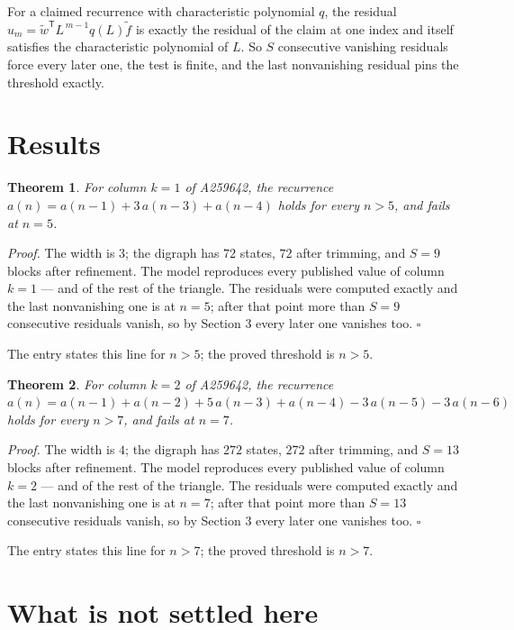 \documentclass[11pt]{article}
\newtheorem{theorem}{Theorem}
\theoremstyle{definition}
\begin{document}
For a claimed recurrence with characteristic polynomial $q$, the residual $u_m = \tilde w^{\mathsf T}L^{\,m-1}q(L)\tilde f$ is exactly the residual of the claim at one index and itself satisfies the characteristic polynomial of $L$. So $S$ consecutive vanishing residuals force every later one, the test is finite, and the last nonvanishing residual pins the threshold exactly.

\section{Results}

\begin{theorem} For column $k = 1$ of A259642, the recurrence $a(n) = a(n-1) + 3\,a(n-3) + a(n-4)$ holds for every $n > 5$, and fails at $n = 5$.\end{theorem}

{\itshape Proof.} The width is $3$; the digraph has $72$ states, $72$ after trimming, and $S = 9$ blocks after refinement. The model reproduces every published value of column $k = 1$ --- and of the rest of the triangle. The residuals were computed exactly and the last nonvanishing one is at $n = 5$; after that point more than $S = 9$ consecutive residuals vanish, so by Section 3 every later one vanishes too. $\square$

The entry states this line for $n > 5$; the proved threshold is $n > 5$.

\begin{theorem} For column $k = 2$ of A259642, the recurrence $a(n) = a(n-1) + a(n-2) + 5\,a(n-3) + a(n-4) - 3\,a(n-5) - 3\,a(n-6)$ holds for every $n > 7$, and fails at $n = 7$.\end{theorem}

{\itshape Proof.} The width is $4$; the digraph has $272$ states, $272$ after trimming, and $S = 13$ blocks after refinement. The model reproduces every published value of column $k = 2$ --- and of the rest of the triangle. The residuals were computed exactly and the last nonvanishing one is at $n = 7$; after that point more than $S = 13$ consecutive residuals vanish, so by Section 3 every later one vanishes too. $\square$

The entry states this line for $n > 7$; the proved threshold is $n > 7$.

\section{What is not settled here}
\end{document}

